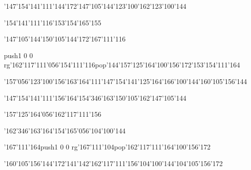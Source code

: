 \null\vfill\ipa\centerline{\enskip\char'147\char'154\char'141\char'111\char'144\char'172\enskip\enskip\enskip\enskip\char'147\char'105\char'144\enskip\enskip\enskip\enskip\enskip\enskip\char'123\char'100\char'162\enskip\char'123\char'100\char'144}\medskip\centerline{\enskip\enskip\enskip\enskip\char'154\char'141\char'111\char'116\enskip\enskip\enskip\enskip\enskip\enskip\enskip\enskip\enskip\enskip\enskip\char'153\char'154\char'165\char'155}\medskip\centerline{\enskip\char'147\char'105\char'144\enskip\enskip\enskip\enskip\char'150\char'105\char'144\char'172\enskip\enskip\enskip\char'167\char'111\char'116}\medskip\centerline{\enskip\pdfcolorstack\match push{1 0 0 rg}\char'162\char'117\char'111\char'056\char'154\char'111\char'116\pdfcolorstack\match pop{}\enskip\enskip\enskip\enskip\enskip\char'144\char'157\char'125\char'164\enskip\char'100\char'156\char'172\enskip\char'153\char'154\char'111\char'164}\medskip\centerline{\enskip\char'157\char'056\char'123\char'100\char'156\char'163\char'164\enskip\char'111\enskip\char'147\char'154\char'141\char'125\char'164\enskip\char'166\char'100\char'144\enskip\enskip\enskip\char'160\char'105\char'156\char'144\enskip\enskip\enskip\enskip}\medskip\vfill\footline{\hfil\tt\folio\hfil}\eject
\null\vfill\ipa\centerline{\enskip\char'147\char'154\char'141\char'111\char'156\char'164\enskip\enskip\enskip\enskip\char'154\char'346\char'163\enskip\enskip\enskip\enskip\enskip\enskip\char'150\char'105\char'162\enskip\char'147\char'105\char'144}\medskip\centerline{\enskip\char'157\char'125\char'164\char'056\char'162\char'117\char'111\char'156\enskip\enskip\enskip\enskip\enskip\enskip\enskip\enskip\enskip\enskip\enskip\enskip\enskip\enskip\enskip}\medskip\centerline{\enskip\enskip\enskip\enskip\enskip\enskip\enskip\enskip\char'162\char'346\char'163\char'164\enskip\char'154\char'165\char'056\char'104\char'100\char'144}\medskip\centerline{\enskip\enskip\enskip\enskip\char'167\char'111\char'164\enskip\pdfcolorstack\match push{1 0 0 rg}\char'167\char'111\char'104\pdfcolorstack\match pop{}\enskip\char'162\char'117\char'111\char'164\enskip\char'100\char'156\char'172\enskip\enskip\enskip\enskip\enskip}\medskip\centerline{\enskip\enskip\char'160\char'105\char'156\char'144\char'172\enskip\char'141\enskip\char'142\char'162\char'117\char'111\char'156\enskip\char'104\char'100\char'144\enskip\enskip\enskip\char'104\char'105\char'156\char'172\enskip\enskip\enskip\enskip}\medskip\vfill\footline{\hfil\tt\folio\hfil}\eject
